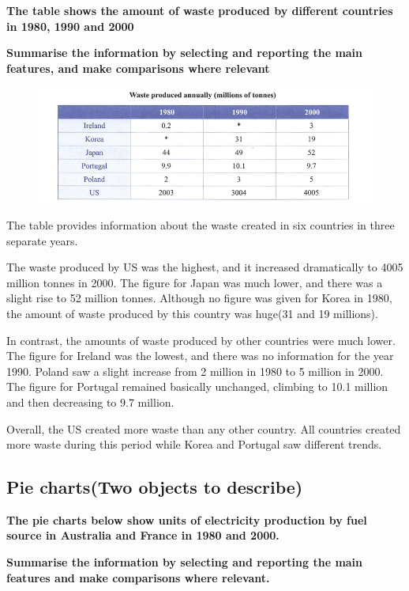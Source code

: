 \documentclass[conference]{IEEEtran}
\begin{document}
\textbf{The table shows the amount of waste produced by different countries in 1980, 1990 and 2000}

\textbf{Summarise the information by selecting and reporting the main features, and make comparisons where relevant}

\begin{figure}[htbp]
    \centerline{\includegraphics[width=1.1\columnwidth]{images/4.png}}
\end{figure}

The table provides information about the waste created in six countries in three separate years.

The waste produced by US was the highest, and it increased dramatically to 4005 million tonnes in 2000.
The figure for Japan was much lower, and there was a slight rise to 52 million tonnes.
Although no figure was given for Korea in 1980, the amount of waste produced by this country was huge(31 and 19 millions).

In contrast, the amounts of waste produced by other countries were much lower.
The figure for Ireland was the lowest, and there was no information for the year 1990.
Poland saw a slight increase from 2 million in 1980 to 5 million in 2000.
The figure for Portugal remained basically unchanged, climbing to 10.1 million and then decreasing to 9.7 million.

Overall, the US created more waste than any other country.
All countries created more waste during this period while Korea and Portugal saw different trends.

\subsection{Pie charts(Two objects to describe)}

\textbf{The pie charts below show units of electricity production by fuel source in Australia and France in 1980 and 2000.}

\textbf{Summarise the information by selecting and reporting the main features and make comparisons where relevant.}
\end{document}
